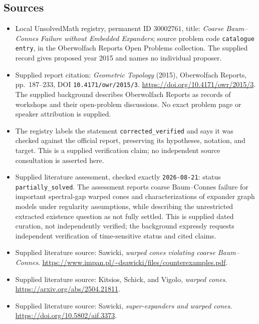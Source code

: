 \documentclass[11pt]{article}
\begin{document}
\subsection{Sources}
\begin{itemize}
\item Local UnsolvedMath registry, permanent ID \(30002761\), title: \emph{Coarse Baum--Connes Failure without Embedded Expanders}; source problem code \texttt{catalogue entry}, in the Oberwolfach Reports Open Problems collection. The supplied record gives proposed year 2015 and names no individual proposer.
\item Supplied report citation: \emph{Geometric Topology} (2015), Oberwolfach Reports, pp.~187--233, DOI \texttt{10.4171/owr/2015/3}. \url{https://doi.org/10.4171/owr/2015/3}. The supplied background describes Oberwolfach Reports as records of workshops and their open-problem discussions. No exact problem page or speaker attribution is supplied.
\item The registry labels the statement \texttt{corrected\_verified} and says it was checked against the official report, preserving its hypotheses, notation, and target. This is a supplied verification claim; no independent source consultation is asserted here.
\item Supplied literature assessment, checked exactly \texttt{2026-08-21}: status \texttt{partially\_solved}. The assessment reports coarse Baum--Connes failure for important spectral-gap warped cones and characterizations of expander graph models under regularity assumptions, while describing the unrestricted extracted existence question as not fully settled. This is supplied dated curation, not independently verified; the background expressly requests independent verification of time-sensitive status and cited claims.
\item Supplied literature source: Sawicki, \emph{warped cones violating coarse Baum--Connes}. \url{https://www.impan.pl/~dsawicki/files/counterexamples.pdf}.
\item Supplied literature source: Kitsios, Schick, and Vigolo, \emph{warped cones}. \url{https://arxiv.org/abs/2504.21811}.
\item Supplied literature source: Sawicki, \emph{super-expanders and warped cones}. \url{https://doi.org/10.5802/aif.3373}.
\end{itemize}
\end{document}
